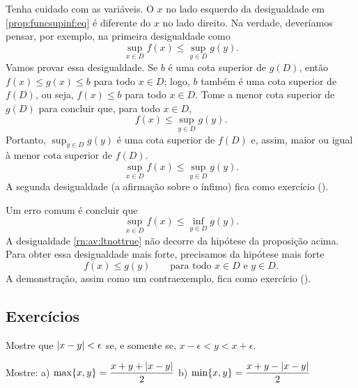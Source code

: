 Tenha cuidado com as variáveis. O $x$ no lado esquerdo da
desigualdade em \eqref{prop:funcsupinf:eq}
é diferente do $x$ no lado direito. Na verdade,
deveríamos pensar, por exemplo, na primeira desigualdade como
\begin{equation*}
\sup_{x \in D} f(x) \leq \sup_{y \in D} g(y) .
\end{equation*}
Vamos provar essa desigualdade. Se $b$ é uma cota superior de $g(D)$, então
$f(x) \leq g(x) \leq b$ para todo $x \in D$; logo, $b$ também é uma cota superior
de $f(D)$,
ou seja, $f(x) \leq b$ para todo $x \in D$.
Tome a menor cota superior de $g(D)$ para concluir que, para todo $x \in D$,
\begin{equation*}
f(x) \leq \sup_{y \in D} g(y) .
\end{equation*}
Portanto,
$\sup_{y \in D} g(y)$ é uma cota superior de $f(D)$ e, assim, maior ou
igual à menor cota superior de $f(D)$.
\begin{equation*}
\sup_{x \in D} f(x) \leq \sup_{y \in D} g(y) .
\end{equation*}
A segunda desigualdade (a afirmação sobre o ínfimo) fica como exercício
().

\medskip

Um erro comum é concluir que
\begin{equation} \label{rn:av:ltnottrue}
\sup_{x \in D} f(x) \leq \inf_{y \in D} g(y) .
\end{equation}
A desigualdade \eqref{rn:av:ltnottrue} não decorre da hipótese
da proposição acima. Para obter essa desigualdade mais forte,
precisamos da hipótese mais forte
\begin{equation*}
f(x) \leq g(y) \qquad \text{para todo } x \in D \text{ e } y \in D.
\end{equation*}
A demonstração, assim como um contraexemplo, fica como exercício
().

\subsection{Exercícios}

\begin{exercise}
Mostre que
$\lvert {x-y} \rvert < \epsilon$ se, e somente se, $x-\epsilon < y < x+\epsilon$.
\end{exercise}

\begin{exercise}
Mostre: \qquad
a)
$\max \{x,y\} = \dfrac{x+y+\lvert {x-y} \rvert}{2}$
\qquad
b)
$\min \{x,y\} = \dfrac{x+y-\lvert {x-y} \rvert}{2}$
\end{exercise}

